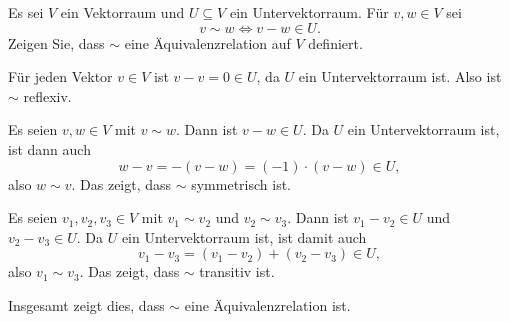 \begin{question}
 Es sei $V$ ein Vektorraum und $U \subseteq V$ ein Untervektorraum. Für $v,w \in V$ sei
 \[
  v \sim w \Leftrightarrow v - w \in U.
 \]
 Zeigen Sie, dass $\sim$ eine Äquivalenzrelation auf $V$ definiert.
\end{question}
\begin{solution}
 Für jeden Vektor $v \in V$ ist $v-v = 0 \in U$, da $U$ ein Untervektorraum ist. Also ist $\sim$ reflexiv.
 
 Es seien $v, w \in V$ mit $v \sim w$. Dann ist $v-w \in U$. Da $U$ ein Untervektorraum ist, ist dann auch
 \[
  w-v = -(v-w) = (-1) \cdot (v-w) \in U,
 \]
 also $w \sim v$. Das zeigt, dass $\sim$ symmetrisch ist.
 
 Es seien $v_1, v_2, v_3 \in V$ mit $v_1 \sim v_2$ und $v_2 \sim v_3$. Dann ist $v_1 - v_2 \in U$ und $v_2 - v_3 \in U$. Da $U$ ein Untervektorraum ist, ist damit auch
 \[
  v_1 - v_3 = (v_1 - v_2) + (v_2 - v_3) \in U,
 \]
 also $v_1 \sim v_3$. Das zeigt, dass $\sim$ transitiv ist.
 
 Insgesamt zeigt dies, dass $\sim$ eine Äquivalenzrelation ist.
\end{solution}




